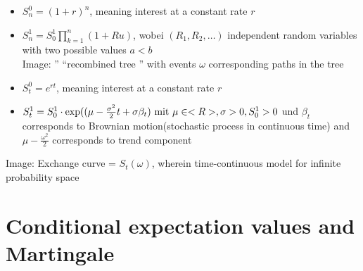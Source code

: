 \begin{*example}
	\begin{itemize}
		\item $S^0_n = (1+r)^n$, meaning interest at a constant rate $r$
		\item $S^1_n = S_0^1 \prod_{k=1}^n(1+Ru)$, wobei $(R_1, R_2, \dots)$ independent random variables with two possible values $a < b$\\
		Image: '' ``recombined tree '' with events $\omega$ corresponding paths in the tree
	\end{itemize}
\end{*example}
\begin{*example}
	\begin{itemize}
		\item $S^0_t = e^{rt}$, meaning interest at a constant rate $r$
		\item $S_t^1 = S_0^1\cdot \exp((\mu - \frac{\sigma^2}{2}t + \sigma\beta_t) \text{ mit } \mu \in <R>, \sigma > 0, S^1_0 >0$ und $\beta_t$ 
		corresponds to Brownian motion(stochastic process in continuous time) and $\mu - \frac{\omega^2}{2}$ corresponds to trend component
	\end{itemize}
	Image: Exchange curve = $S_t(\omega)$, wherein time-continuous model for infinite probability space
\end{*example}
\section{Conditional expectation values and Martingale} %
